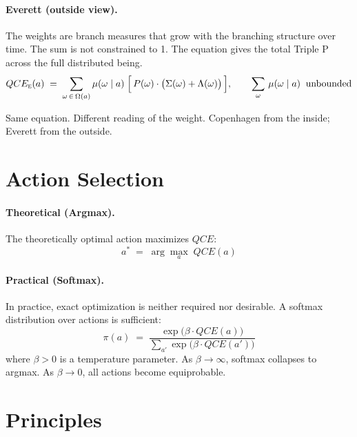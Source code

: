 \documentclass[12pt]{article}
\begin{document}
\paragraph{Everett (outside view).}
The weights are branch measures that grow with the branching structure over time. The sum is not constrained to 1. The equation gives the total Triple P across the full distributed being.
\begin{equation}
QCE_{\textsc{e}}(a)\;=\;\sum_{\omega\,\in\,\Omega(a)}\mu(\omega\mid a)\;\Big[\,P(\omega)\cdot\big(\Sigma(\omega)+\Lambda(\omega)\big)\,\Big],\qquad \sum_{\omega}\,\mu(\omega\mid a)\;\;\text{unbounded}
\end{equation}

Same equation. Different reading of the weight. Copenhagen from the inside; Everett from the outside.

\section{Action Selection}

\paragraph{Theoretical (Argmax).}
The theoretically optimal action maximizes $QCE$:
\begin{equation}
\boxed{\;a^{*}\;=\;\arg\max_{a}\;QCE(a)\;}
\end{equation}

\paragraph{Practical (Softmax).}
In practice, exact optimization is neither required nor desirable. A softmax distribution over actions is sufficient:
\begin{equation}
\boxed{\;\pi(a)\;=\;\frac{\exp\!\big(\beta\cdot QCE(a)\big)}{\displaystyle\sum_{a'}\exp\!\big(\beta\cdot QCE(a')\big)}\;}
\end{equation}
where $\beta>0$ is a temperature parameter. As $\beta\to\infty$, softmax collapses to argmax. As $\beta\to 0$, all actions become equiprobable.

\section{Principles}
\end{document}
